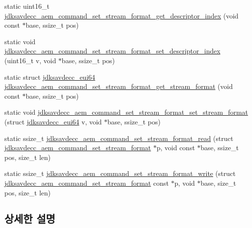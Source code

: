 \begin{DoxyCompactItemize}
\item 
static uint16\+\_\+t \hyperlink{group__command__set__stream__format_gaa334a23ebba7bd3f2d5c193a2283c38e}{jdksavdecc\+\_\+aem\+\_\+command\+\_\+set\+\_\+stream\+\_\+format\+\_\+get\+\_\+descriptor\+\_\+index} (void const $\ast$base, ssize\+\_\+t pos)
\item 
static void \hyperlink{group__command__set__stream__format_ga2895d179ad5c426d2d2baef69641a7d6}{jdksavdecc\+\_\+aem\+\_\+command\+\_\+set\+\_\+stream\+\_\+format\+\_\+set\+\_\+descriptor\+\_\+index} (uint16\+\_\+t v, void $\ast$base, ssize\+\_\+t pos)
\item 
static struct \hyperlink{structjdksavdecc__eui64}{jdksavdecc\+\_\+eui64} \hyperlink{group__command__set__stream__format_ga54974d0b8f7e1ee1922df3a65d2a44a7}{jdksavdecc\+\_\+aem\+\_\+command\+\_\+set\+\_\+stream\+\_\+format\+\_\+get\+\_\+stream\+\_\+format} (void const $\ast$base, ssize\+\_\+t pos)
\item 
static void \hyperlink{group__command__set__stream__format_ga31d011984248200d22212b36d1bc825d}{jdksavdecc\+\_\+aem\+\_\+command\+\_\+set\+\_\+stream\+\_\+format\+\_\+set\+\_\+stream\+\_\+format} (struct \hyperlink{structjdksavdecc__eui64}{jdksavdecc\+\_\+eui64} v, void $\ast$base, ssize\+\_\+t pos)
\item 
static ssize\+\_\+t \hyperlink{group__command__set__stream__format_ga22b543c1e08650d6b9655327a9fd53d9}{jdksavdecc\+\_\+aem\+\_\+command\+\_\+set\+\_\+stream\+\_\+format\+\_\+read} (struct \hyperlink{structjdksavdecc__aem__command__set__stream__format}{jdksavdecc\+\_\+aem\+\_\+command\+\_\+set\+\_\+stream\+\_\+format} $\ast$p, void const $\ast$base, ssize\+\_\+t pos, size\+\_\+t len)
\item 
static ssize\+\_\+t \hyperlink{group__command__set__stream__format_ga52683ffa93eb5b180190041f82194ca9}{jdksavdecc\+\_\+aem\+\_\+command\+\_\+set\+\_\+stream\+\_\+format\+\_\+write} (struct \hyperlink{structjdksavdecc__aem__command__set__stream__format}{jdksavdecc\+\_\+aem\+\_\+command\+\_\+set\+\_\+stream\+\_\+format} const $\ast$p, void $\ast$base, size\+\_\+t pos, size\+\_\+t len)
\end{DoxyCompactItemize}


\subsection{상세한 설명}


